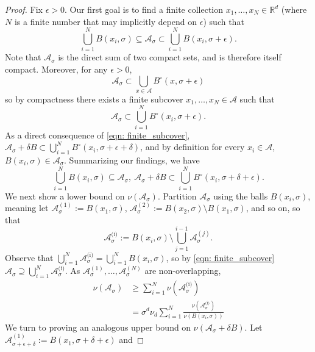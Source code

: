 \documentclass[11pt,twoside]{article}
\theoremstyle{definition}
\newcommand{\Reals}{\mathbb{R}}
\newcommand{\Rd}{\Reals^d}
\newcommand{\1}{\mathbbm{1}}
\newcommand{\Aset}{\mathcal{A}}
\newcommand{\Asig}{\Aset_{\sigma}}
\begin{document}
\begin{proof}
	
	Fix $\epsilon > 0$. Our first goal is to find a finite collection $x_1, \ldots, x_N \in \Rd$ (where $N$ is a finite number that may implicitly depend on $\epsilon$) such that
	\begin{equation*}
	\bigcup_{i = 1}^{N} B(x_i, \sigma) \subseteq \Asig \subset \bigcup_{i = 1}^{N} B(x_i, \sigma + \epsilon).
	\end{equation*}
	Note that $\Asig$ is the direct sum of two compact sets, and is therefore itself compact. Moreover, for any $\epsilon > 0$,
	\begin{equation*}
	\Asig \subset \bigcup_{x \in \Aset} B^{\circ}(x,\sigma + \epsilon)
	\end{equation*}
	so by compactness there exists a finite subcover $x_1, \ldots,x_N \in \Aset$ such that
	\begin{equation}
	\label{eqn: finite_subcover}
	\Asig \subset \bigcup_{i = 1}^{N} B^{\circ}(x_i,\sigma + \epsilon).
	\end{equation}
	As a direct consequence of \eqref{eqn: finite_subcover}, $\Asig + \delta B \subset \bigcup_{i = 1}^{N} B^{\circ}(x_i,\sigma + \epsilon + \delta)$, and by definition for every $x_i \in \Aset$, $B(x_i,\sigma) \in \Asig$. Summarizing our findings, we have
	\begin{equation}
	\label{eqn: finite_subcover-1}
	\bigcup_{i = 1}^{N} B(x_i,\sigma) \subseteq \Asig  ,~\Asig + \delta B \subset \bigcup_{i = 1}^{N} B^{\circ}(x_i,\sigma + \delta + \epsilon).
	\end{equation}
\noindent	We next show a lower bound on $\nu(\Asig)$. Partition $\Asig$ using the balls $B(x_i,\sigma)$, meaning let $\Aset_{\sigma}^{(1)} := B(x_1,\sigma)$, $\Aset_{\sigma}^{(2)} := B(x_2,\sigma) \setminus B(x_1,\sigma)$, and so on, so that
	\begin{equation*}
	\Aset_{\sigma}^{\text{(i)}} := B(x_i,\sigma) \setminus \bigcup_{j = 1}^{i - 1} \Aset_{\sigma}^{(j)}. \tag{$i = 1,\ldots,N$}
	\end{equation*}
	Observe that $\bigcup_{i = 1}^{N} \Asig^{\text{(i)}} = \bigcup_{i = 1}^{N} B(x_i,\sigma)$, so by \eqref{eqn: finite_subcover} $\Asig \supseteq \bigcup_{i = 1}^{N} \Asig^{\text{(i)}}$. As $\Asig^{(1)},\ldots, \Asig^{(N)}$ are non-overlapping,
	\begin{align*}
	\nu(\Asig) & \geq \sum_{i = 1}^{N} \nu(\Asig^{\text{(i)}}) \\
	& = \sigma^d \nu_d \sum_{i = 1}^{N}  \frac{\nu(\Asig^{\text{(i)}})}{\nu(B(x_i,\sigma))}
	\end{align*}
	We turn to proving an analogous upper bound on $\nu(\Asig + \delta B)$. Let $\Aset_{\sigma + \epsilon + \delta}^{(1)} := B(x_1,\sigma + \delta + \epsilon)$ and

\end{proof}
\end{document}
